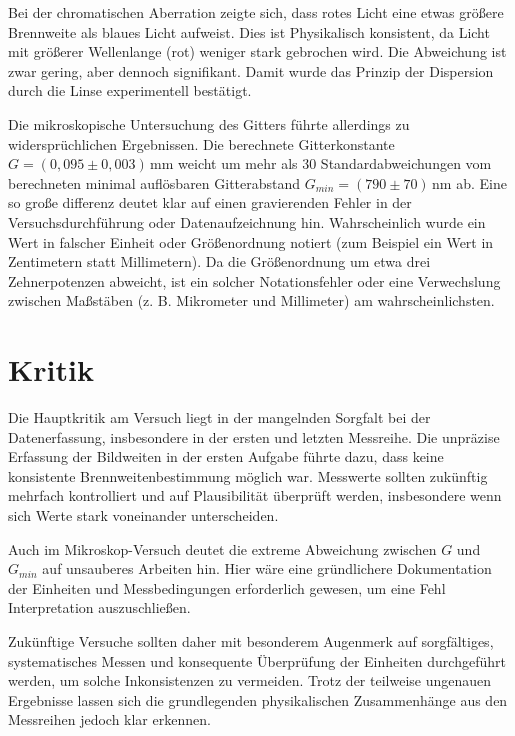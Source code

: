 Bei der chromatischen Aberration zeigte sich, dass rotes Licht eine etwas größere Brennweite als blaues Licht aufweist. Dies ist Physikalisch konsistent, da Licht mit größerer Wellenlange (rot) weniger stark gebrochen wird. Die Abweichung ist zwar gering, aber dennoch signifikant. Damit wurde das Prinzip der Dispersion durch die Linse experimentell bestätigt.

Die mikroskopische Untersuchung des Gitters führte allerdings zu widersprüchlichen Ergebnissen. Die berechnete Gitterkonstante $G = (0{,}095 \pm 0{,}003)\,\mathrm{mm}$ weicht um mehr als 30 Standardabweichungen vom berechneten minimal auflösbaren Gitterabstand $G_{min} = (790 \pm 70)\,\mathrm{nm}$ ab. Eine so große differenz deutet klar auf einen gravierenden Fehler in der Versuchsdurchführung oder Datenaufzeichnung hin. Wahrscheinlich wurde ein Wert in falscher Einheit oder Größenordnung notiert (zum Beispiel ein Wert in Zentimetern statt Millimetern). Da die Größenordnung um etwa drei Zehnerpotenzen abweicht, ist ein solcher Notationsfehler oder eine Verwechslung zwischen Maßstäben (z. B. Mikrometer und Millimeter) am wahrscheinlichsten.

\section{Kritik}

Die Hauptkritik am Versuch liegt in der mangelnden Sorgfalt bei der Datenerfassung, insbesondere in der ersten und letzten Messreihe. Die unpräzise Erfassung der Bildweiten in der ersten Aufgabe führte dazu, dass keine konsistente Brennweitenbestimmung möglich war. Messwerte sollten zukünftig mehrfach kontrolliert und auf Plausibilität überprüft werden, insbesondere wenn sich Werte stark voneinander unterscheiden.

Auch im Mikroskop-Versuch deutet die extreme Abweichung zwischen $G$ und $G_{min}$ auf unsauberes Arbeiten hin. Hier wäre eine gründlichere Dokumentation der Einheiten und Messbedingungen erforderlich gewesen, um eine Fehl Interpretation auszuschließen.

Zukünftige Versuche sollten daher mit besonderem Augenmerk auf sorgfältiges, systematisches Messen und konsequente Überprüfung der Einheiten durchgeführt werden, um solche Inkonsistenzen zu vermeiden. Trotz der teilweise ungenauen Ergebnisse lassen sich die grundlegenden physikalischen Zusammenhänge aus den Messreihen jedoch klar erkennen.
